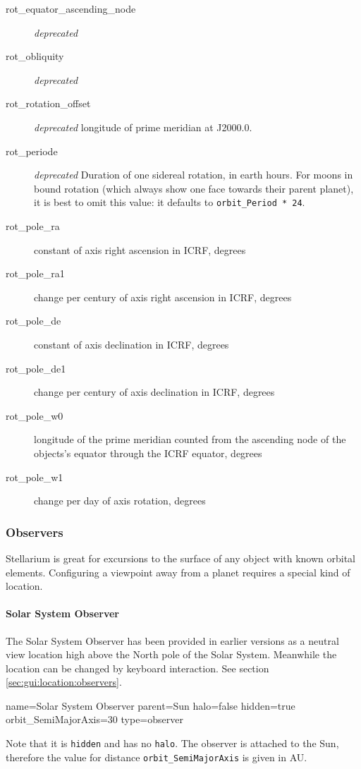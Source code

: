 \begin{description}
  \item[rot\_equator\_ascending\_node] \emph{deprecated}
  \item[rot\_obliquity] \emph{deprecated}
  \item[rot\_rotation\_offset] \emph{deprecated} longitude of prime meridian at J2000.0. 
  \item[rot\_periode]  \emph{deprecated}  Duration of one sidereal rotation, in earth hours. For moons in bound rotation 
       (which always show one face towards their parent planet), it is best to omit this value: it defaults to \texttt{orbit\_Period * 24}. 

  \item[rot\_pole\_ra]  constant of axis right ascension in ICRF, degrees
  \item[rot\_pole\_ra1] change per century of axis right ascension in ICRF, degrees
  \item[rot\_pole\_de] constant of axis declination in ICRF, degrees
  \item[rot\_pole\_de1] change per century of axis declination in ICRF, degrees
  \item[rot\_pole\_w0] longitude of the prime meridian counted from the
    ascending node of the objects's equator through the ICRF equator, degrees
  \item[rot\_pole\_w1] change per day of axis rotation, degrees  
\end{description}



\subsubsection{Observers}
\label{sec:ssystem.ini:Observers}

Stellarium is great for excursions to the surface of any object with
known orbital elements.  Configuring a viewpoint away from a planet
requires a special kind of location.

\paragraph{Solar System Observer}
\label{sec:ssystem.ini:SolarSystemObserver}

The Solar System Observer has
been provided in earlier versions as a neutral view location high above the North pole of
the Solar System. Meanwhile  the location can be changed by keyboard interaction. See section \ref{sec:gui:location:observers}.
\begin{configfile}
name=Solar System Observer
parent=Sun
halo=false
hidden=true
orbit_SemiMajorAxis=30
type=observer
\end{configfile}
Note that it is \texttt{hidden} and has no \texttt{halo}. 
The observer is attached to the Sun, therefore the value for distance \texttt{orbit\_SemiMajorAxis} is given in AU.

